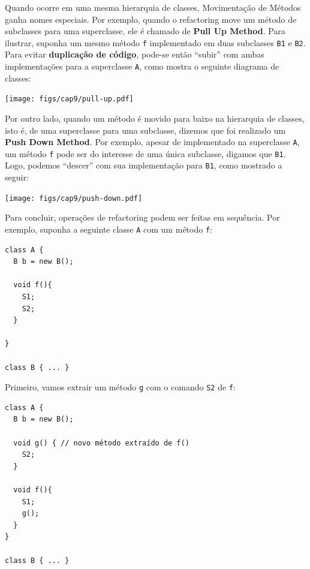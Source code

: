 \documentclass[
  11pt,
  twoside]{book}
\newcommand{\passthrough}[1]{#1}
\let\origfigure\figure
\let\endorigfigure\endfigure
\renewenvironment{figure}[1][2] {
    \expandafter\origfigure\expandafter[!h]
} {
    \endorigfigure
}
\begin{document}

Quando ocorre em uma mesma hierarquia de classes, Movimentação de
Métodos ganha nomes especiais. Por exemplo, quando o refactoring move um
método de subclasses para uma superclasse, ele é chamado de \textbf{Pull
Up Method}. Para ilustrar, suponha um mesmo método
\passthrough{\lstinline!f!} implementado em duas subclasses
\passthrough{\lstinline!B1!} e \passthrough{\lstinline!B2!}. Para evitar
\textbf{duplicação de código}, pode-se então ``subir'' com ambas
implementações para a superclasse \passthrough{\lstinline!A!}, como
mostra o seguinte diagrama de classes:

\begin{figure}
\centering
\texttt{[image: figs/cap9/pull-up.pdf]}
\caption{Pull Up Method}
\end{figure}


Por outro lado, quando um método é movido para baixo na hierarquia de
classes, isto é, de uma superclasse para uma subclasse, dizemos que foi
realizado um \textbf{Push Down Method}. Por exemplo, apesar de
implementado na superclasse \passthrough{\lstinline!A!}, um método
\passthrough{\lstinline!f!} pode ser do interesse de uma única
subclasse, digamos que \passthrough{\lstinline!B1!}. Logo, podemos
``descer'' com sua implementação para \passthrough{\lstinline!B1!}, como
mostrado a seguir:

\begin{figure}
\centering
\texttt{[image: figs/cap9/push-down.pdf]}
\caption{Push Down Method}
\end{figure}

Para concluir, operações de refactoring podem ser feitas em sequência.
Por exemplo, suponha a seguinte classe \passthrough{\lstinline!A!} com
um método \passthrough{\lstinline!f!}:

\newpage

\begin{lstlisting}
class A {
  B b = new B();

  void f(){
    S1;
    S2;
  }

}

class B { ... }
\end{lstlisting}

Primeiro, vamos extrair um método \passthrough{\lstinline!g!} com o
comando \passthrough{\lstinline!S2!} de \passthrough{\lstinline!f!}:

\begin{lstlisting}
class A {
  B b = new B();

  void g() { // novo método extraído de f()
    S2;
  }

  void f(){
    S1;
    g();
  }
}

class B { ... }
\end{lstlisting}
\end{document}
